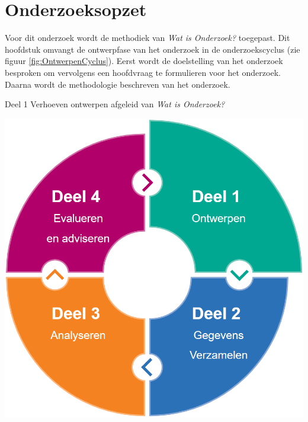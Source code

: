 \chapter{Onderzoeksopzet}
\label{chap:Onderzoeksopzet}
Voor dit onderzoek wordt de methodiek van \textit{Wat is Onderzoek?} \Parencite{Verhoeven} toegepast. 
Dit hoofdstuk omvangt de ontwerpfase van het onderzoek in de onderzoekscyclus (zie figuur \ref{fig:OntwerpenCyclus}).
Eerst wordt de doelstelling van het onderzoek besproken om vervolgens een hoofdvraag te formulieren voor het onderzoek.
Daarna wordt de methodologie beschreven van het onderzoek.

\begin{graphic}
	\vspace{0.2cm}
	\captionsetup{type=figure}
    \caption{Deel 1 Verhoeven ontwerpen afgeleid van \textit{Wat is Onderzoek?}}
	\includegraphics[scale=0.3]{img/OntwerpenCyclus.png}
	\label{fig:OntwerpenCyclus}
	\vspace{0.2cm}
\end{graphic}


\newpage

% 
% 
